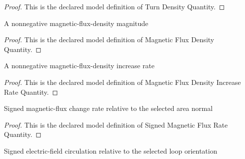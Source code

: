 \begin{proof}
  This is the declared model definition of Turn Density Quantity.
\end{proof}
\begin{definition}
  \label{def:physics:phyx-mini-0938:phyxminiproblems-problemphyxmini0938-magneticfluxdensityquantity}
  A nonnegative magnetic-flux-density magnitude
\end{definition}
\begin{proof}
  This is the declared model definition of Magnetic Flux Density Quantity.
\end{proof}
\begin{definition}
  \label{def:physics:phyx-mini-0938:phyxminiproblems-problemphyxmini0938-magneticfluxdensityincreaseratequantity}
  A nonnegative magnetic-flux-density increase rate
\end{definition}
\begin{proof}
  This is the declared model definition of Magnetic Flux Density Increase Rate Quantity.
\end{proof}
\begin{definition}
  \label{def:physics:phyx-mini-0938:phyxminiproblems-problemphyxmini0938-signedmagneticfluxratequantity}
  Signed magnetic-flux change rate relative to the selected area normal
\end{definition}
\begin{proof}
  This is the declared model definition of Signed Magnetic Flux Rate Quantity.
\end{proof}
\begin{definition}
  \label{def:physics:phyx-mini-0938:phyxminiproblems-problemphyxmini0938-signedelectriccirculationquantity}
  Signed electric-field circulation relative to the selected loop orientation
\end{definition}
